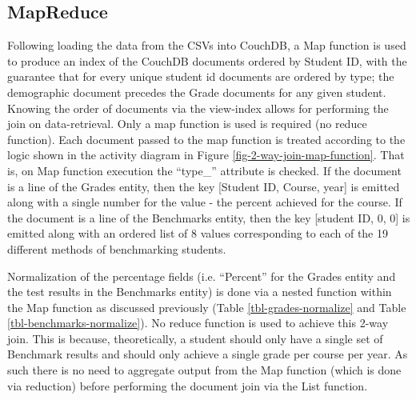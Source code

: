 \subsection{MapReduce}
Following loading the data from the CSVs into CouchDB, a Map function is used to produce an index of the CouchDB documents ordered by Student ID, with the guarantee that for every unique student id documents are ordered by type; the demographic document precedes the Grade documents for any given student. Knowing the order of documents via the view-index allows for performing the join on data-retrieval. Only a map function is used is required (no reduce function). Each document passed to the map function is treated according to the logic shown in the activity diagram in Figure \ref{fig-2-way-join-map-function}. That is, on Map function execution the ``type\_'' attribute is checked. If the document is a line of the Grades entity, then the key [Student ID, Course, year] is emitted along with a single number for the value - the percent achieved for the course. If the document is a line of the Benchmarks entity, then the key [student ID, 0, 0] is emitted along with an ordered list of 8 values corresponding to each of the 19 different methods of benchmarking students.

Normalization of the percentage fields (i.e. ``Percent'' for the Grades entity and the test results in the Benchmarks entity) is done via a nested function within the Map function as discussed previously (Table \ref{tbl-grades-normalize} and Table \ref{tbl-benchmarks-normalize}). No reduce function is used to achieve this 2-way join. This is because, theoretically, a student should only have a single set of Benchmark results and should only achieve a single grade per course per year. As such there is no need to aggregate output from the Map function (which is done via reduction) before performing the document join via the List function.



